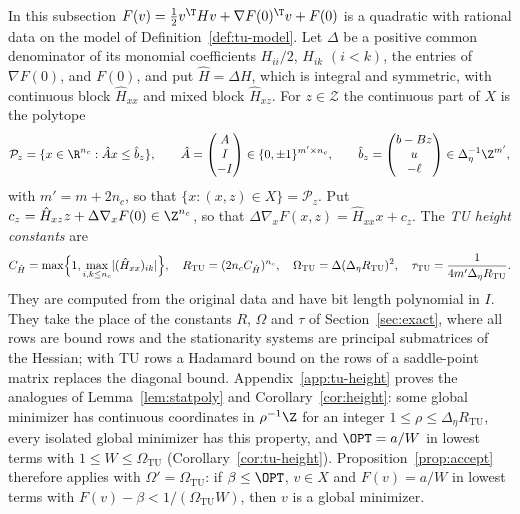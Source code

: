 In this subsection $F(v)=\frac12v^{\T}Hv+\nabla F(0)^{\T}v+F(0)$ is a
quadratic with rational data on the model of Definition~\ref{def:tu-model}.
Let $\Delta$ be a positive common denominator of its monomial coefficients
$H_{ii}/2$, $H_{ik}$ $(i<k)$, the entries of $\nabla F(0)$, and $F(0)$, and
put $\hat H=\Delta H$, which is
integral and symmetric, with continuous block $\hat H_{xx}$ and mixed block
$\hat H_{xz}$. For $z\in\mathcal Z$ the continuous part of $X$ is the polytope
\[
\mathcal P_z=\{x\in\R^{n_c}:\hat Ax\le\hat b_z\},\qquad
\hat A=\begin{pmatrix}A\\ I\\ -I\end{pmatrix}\in\{0,\pm1\}^{m'\times n_c},\qquad
\hat b_z=\begin{pmatrix}b-Bz\\ u\\ -\ell\end{pmatrix}\in\Delta_\eta^{-1}\Z^{m'},
\]
with $m'=m+2n_c$, so that $\{x:(x,z)\in X\}=\mathcal P_z$. Put
$c_z=\hat H_{xz}z+\Delta\nabla_xF(0)\in\Z^{n_c}$, so that
$\Delta\nabla_xF(x,z)=\hat H_{xx}x+c_z$. The \emph{TU height constants} are
\begin{equation}\label{eq:tu-constants}
C_{\hat H}=\max\Bigl\{1,\max_{i,k\le n_c}\lvert(\hat H_{xx})_{ik}\rvert\Bigr\},\quad
R_{\mathrm{TU}}=(2n_cC_{\hat H})^{n_c},\quad
\Omega_{\mathrm{TU}}=\Delta(\Delta_\eta R_{\mathrm{TU}})^2,\quad
\tau_{\mathrm{TU}}=\frac1{4m'\Delta_\eta R_{\mathrm{TU}}} .
\end{equation}
They are computed from the original data and have bit length polynomial in
$I$. They take the place of the constants $R$, $\Omega$ and $\tau$ of
Section~\ref{sec:exact}, where all rows are bound rows and the stationarity
systems are principal submatrices of the Hessian; with TU rows a Hadamard
bound on the rows of a saddle-point matrix replaces the diagonal bound.
Appendix~\ref{app:tu-height} proves the analogues of Lemma~\ref{lem:statpoly} and
Corollary~\ref{cor:height}: some global minimizer has continuous coordinates
in $\rho^{-1}\Z$ for an integer $1\le\rho\le\Delta_\eta R_{\mathrm{TU}}$, every
isolated global minimizer has this property, and $\OPT=a/W$ in lowest terms
with $1\le W\le\Omega_{\mathrm{TU}}$ (Corollary~\ref{cor:tu-height}).
Proposition~\ref{prop:accept} therefore applies with
$\Omega'=\Omega_{\mathrm{TU}}$: if $\beta\le\OPT$, $v\in X$ and $F(v)=a/W$ in
lowest terms with $F(v)-\beta<1/(\Omega_{\mathrm{TU}}W)$, then $v$ is a global
minimizer.

